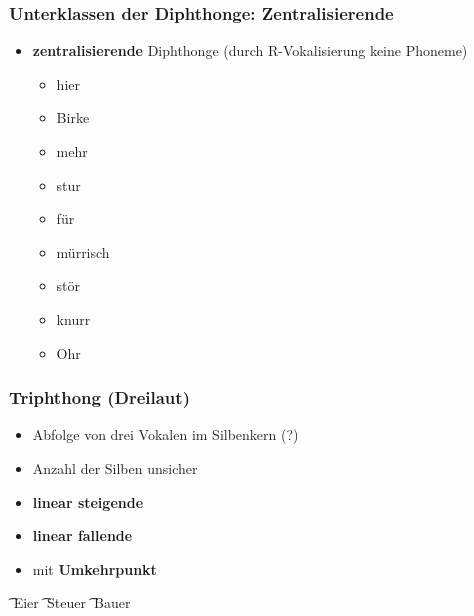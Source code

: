 \begin{frame}
\frametitle{Unterklassen der Diphthonge: Zentralisierende}

	\begin{itemize}
		\item \textbf{zentralisierende} Diphthonge (durch R-Vokalisierung \ras keine Phoneme)

		\ea 
		\begin{itemize}
			\item {} \ras hier
			\item {} \ras Birke
			\item {} \ras mehr
			\item {} \ras stur
			\item {} \ras für
			\item {} \ras mürrisch
			\item {} \ras stör
			\item {} \ras knurr
			\item {} \ras Ohr
		\end{itemize}
		\z
		
	\end{itemize}

						 		
	
\end{frame}



\begin{frame}
\frametitle{Triphthong (Dreilaut)}
	
	\begin{itemize}
		\item Abfolge von drei Vokalen im Silbenkern (?)
			\item Anzahl der Silben \ras unsicher
			\item \textbf{linear steigende}
			\item \textbf{linear fallende}
			\item mit \textbf{Umkehrpunkt}
	\end{itemize}
	
	\eal
	\ex \t{} \ras Eier
	\ex \t{} \ras Steuer
	\ex \t{} \ras Bauer
	\zl
	

\end{frame}

	
	
%
